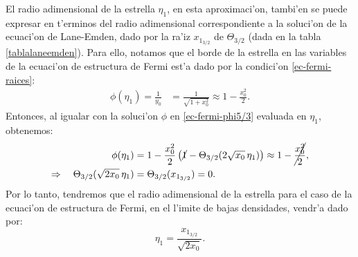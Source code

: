 El radio adimensional de la estrella $\eta_1$, en esta aproximaci'on, tambi'en se puede expresar en t'erminos del radio adimensional correspondiente a la soluci'on de la ecuaci'on de Lane-Emden, dado por la ra'iz $x_{1_{3/2}}$ de $\Theta_{3/2}$ (dada en la tabla \ref{tablalaneemden}). Para ello, notamos que el borde de la estrella en las variables de la ecuaci'on de estructura de Fermi est'a dado por la condici'on \eqref{ec-fermi-raices}:
\begin{align}
 \phi(\eta_1)=\frac{1}{y_0}&=\frac{1}{\sqrt{1+x_0^2}}\approx1-\frac{x_0^2}{2}.
\end{align}
Entonces, al igualar con la soluci'on $\phi$ en \eqref{ec-fermi-phi5/3} evaluada en $\eta_1$, obtenemos:
\begin{align}
 \phi(\eta_1)&=1-\frac{x_0^2}{2}\left(\cancel{1}-\Theta_{3/2}(2\sqrt{x_0} \,\eta_1)\right)\approx1-\cancel{\frac{x_0^2}{2}},\\
\Rightarrow\quad \Theta_{3/2}(\sqrt{2x_0} \,\eta_1)&=\Theta_{3/2}(x_{1_{3/2}})=0.
\end{align}
Por lo tanto, tendremos que el radio adimensional de la estrella para el caso de la ecuaci'on de estructura de Fermi, en el l'imite de bajas densidades, vendr'a dado por:
\begin{equation}\label{ec-fermi-eta1}
 \eta_1=\frac{x_{1_{3/2}}}{\sqrt{2x_0}}.
\end{equation}

